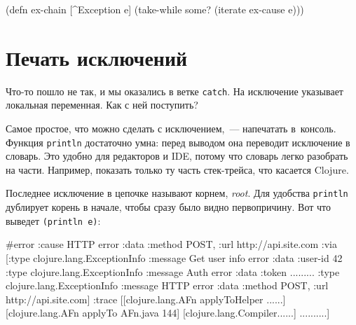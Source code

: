 \else

\begin{english}
  \begin{clojure}
(defn ex-chain [^Exception e]
  (take-while some? (iterate ex-cause e)))
  \end{clojure}
\end{english}

\fi

\section{Печать исключений}

Что-то пошло не так, и мы оказались в ветке \verb|catch|. На исключение
указывает локальная переменная. Как с ней поступить?

Самое простое, что можно сделать с исключением,~--- напечатать в~консоль. Функция
\verb|println| достаточно умна: перед выводом она переводит исключение в
словарь. Это удобно для редакторов и IDE, потому что словарь легко разобрать на
части. Например, показать только ту часть стек-трейса, что касается Clojure.

Последнее исключение в цепочке называют корнем, \emph{root}. Для удобства
\verb|println| дублирует корень в начале, чтобы сразу было видно
первопричину. Вот что выведет \verb|(println e)|:


\ifx\DEVICETYPE\MOBILE

\begin{english}
  \begin{clojure}
#error {
 :cause HTTP error
 :data {:method POST,
        :url http://api.site.com}
 :via
 [{:type clojure.lang.ExceptionInfo
   :message Get user info error
   :data {:user-id 42}}
  {:type clojure.lang.ExceptionInfo
   :message Auth error
   :data {:token .........}}
  {:type clojure.lang.ExceptionInfo
   :message HTTP error
   :data {:method POST,
          :url http://api.site.com}}]
 :trace
 [[clojure.lang.AFn applyToHelper ......]
  [clojure.lang.AFn applyTo AFn.java 144]
  [clojure.lang.Compiler......]
  ..........]}
  \end{clojure}
\end{english}

\else

\begin{english}
\end{english}

